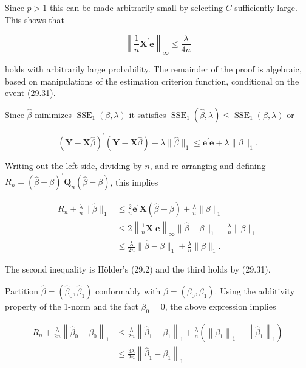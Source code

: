 \documentclass[10pt]{article}
\begin{document}
Since $p>1$ this can be made arbitrarily small by selecting $C$ sufficiently large. This shows that

$$
\left\|\frac{1}{n} \boldsymbol{X}^{\prime} \boldsymbol{e}\right\|_{\infty} \leq \frac{\lambda}{4 n}
$$

holds with arbitrarily large probability. The remainder of the proof is algebraic, based on manipulations of the estimation criterion function, conditional on the event (29.31).

Since $\widehat{\beta}$ minimizes $\operatorname{SSE}_{1}(\beta, \lambda)$ it satisfies $\operatorname{SSE}_{1}(\widehat{\beta}, \lambda) \leq \operatorname{SSE}_{1}(\beta, \lambda)$ or

$$
(\boldsymbol{Y}-\boldsymbol{X} \widehat{\beta})^{\prime}(\boldsymbol{Y}-\boldsymbol{X} \widehat{\beta})+\lambda\|\widehat{\beta}\|_{1} \leq \boldsymbol{e}^{\prime} \boldsymbol{e}+\lambda\|\beta\|_{1} .
$$

Writing out the left side, dividing by $n$, and re-arranging and defining $R_{n}=(\widehat{\beta}-\beta)^{\prime} \boldsymbol{Q}_{n}(\widehat{\beta}-\beta)$, this implies

$$
\begin{aligned}
R_{n}+\frac{\lambda}{n}\|\widehat{\beta}\|_{1} & \leq \frac{2}{n} \boldsymbol{e}^{\prime} \boldsymbol{X}(\widehat{\beta}-\beta)+\frac{\lambda}{n}\|\beta\|_{1} \\
& \leq 2\left\|\frac{1}{n} \boldsymbol{X}^{\prime} \boldsymbol{e}\right\|_{\infty}\|\widehat{\beta}-\beta\|_{1}+\frac{\lambda}{n}\|\beta\|_{1} \\
& \leq \frac{\lambda}{2 n}\|\widehat{\beta}-\beta\|_{1}+\frac{\lambda}{n}\|\beta\|_{1} .
\end{aligned}
$$

The second inequality is Hölder's (29.2) and the third holds by (29.31).

Partition $\widehat{\beta}=\left(\widehat{\beta}_{0}, \widehat{\beta}_{1}\right)$ conformably with $\beta=\left(\beta_{0}, \beta_{1}\right)$. Using the additivity property of the 1-norm and the fact $\beta_{0}=0$, the above expression implies

$$
\begin{aligned}
R_{n}+\frac{\lambda}{2 n}\left\|\widehat{\beta}_{0}-\beta_{0}\right\|_{1} & \leq \frac{\lambda}{2 n}\left\|\widehat{\beta}_{1}-\beta_{1}\right\|_{1}+\frac{\lambda}{n}\left(\left\|\beta_{1}\right\|_{1}-\left\|\widehat{\beta}_{1}\right\|_{1}\right) \\
& \leq \frac{3 \lambda}{2 n}\left\|\widehat{\beta}_{1}-\beta_{1}\right\|_{1}
\end{aligned}
$$
\end{document}
